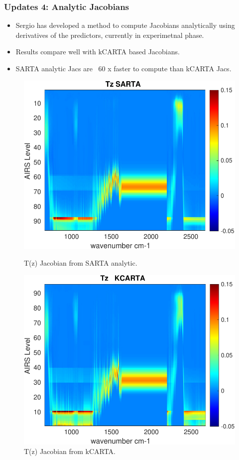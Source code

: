 \documentclass[10pt,t]{beamer}
\begin{document}
\begin{frame}
  \frametitle{Updates 4: Analytic Jacobians}
  \begin{itemize}
  \item Sergio has developed a method to compute Jacobians analytically using derivatives
    of the predictors, currently in experimetnal phase.
  \item Results compare well with kCARTA based Jacobians.
  \item SARTA analytic Jacs are ~60 x faster to compute than kCARTA Jacs. 
  \end{itemize}

\begin{figure}
\begin{minipage}[c]{0.45\linewidth}
  \includegraphics[width=\linewidth]{./Figs/jac_tz_sarta.pdf}
  \caption{T(z) Jacobian from SARTA analytic.}
\end{minipage}
\hfill
\begin{minipage}[c]{0.45\linewidth}
  \includegraphics[width=\linewidth]{./Figs/jac_tz_kcarta.pdf}
  \caption{T(z) Jacobian from kCARTA.}
\end{minipage}
\end{figure}


\end{frame}
\end{document}
